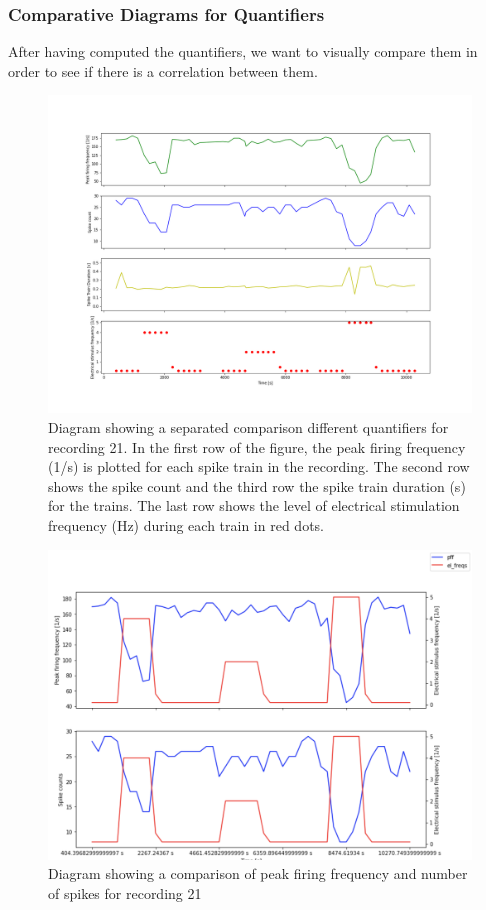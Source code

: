 \subsubsection{Comparative Diagrams for Quantifiers}
After having computed the quantifiers, we want to visually compare them in order to see if there is a correlation between them.
\begin{figure}
	\includegraphics[width = \textwidth]{src/pic/11_12_13_sp}
	\caption{Diagram showing a separated comparison different quantifiers for recording 21. In the first row of the figure, the peak firing frequency (1/s) is plotted for each spike train in the recording. The second row shows the spike count and the third row the spike train duration (s) for the trains. The last row shows the level of electrical stimulation frequency (Hz) during each train in red dots.}
	\label{fig:quantcomp_sp}
\end{figure}
\begin{figure}
	\includegraphics[width = \textwidth]{src/pic/11_12_13_cm}
	\caption{Diagram showing a comparison of peak firing frequency and number of spikes for recording 21}
	\label{fig:quantcomp_cm}
\end{figure}

